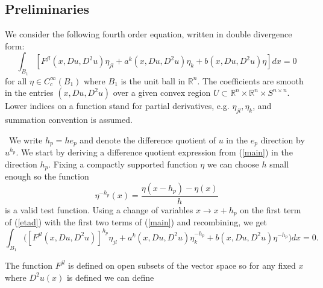 \documentclass[12pt,leqno]{amsart}%
\theoremstyle{plain}
\numberwithin{equation}{section}
\theoremstyle{definition}
\begin{document}


\label{sec_fourth}


\subsection{Preliminaries}

\label{pre} We consider the following fourth order equation, written in double
divergence form:
\begin{equation}
\int_{B_{1}}\left[  F^{jl}(x,Du,D^{2}u)\eta_{jl}+a^{k}(x,Du,D^{2}u)\eta
_{k}+b(x,Du,D^{2}u)\eta\right]  dx=0 \label{main}%
\end{equation}
for all $\eta\in C_{c}^{\infty}(B_{1})$ where $B_{1}$ is the unit ball in
$\mathbb{R}^{n}$. The coefficients are smooth in the entries $(x,Du,D^{2}u)$
over a given convex region $U\subset\mathbb{R}^{n}\times\mathbb{R}^{n}\times
S^{n\times n}.$ Lower indices on a function stand for partial derivatives,
e.g. $\eta_{jl},\eta_{k}$, and summation convention is assumed. \newline

\ We write $h_{p}=he_{p}$ and denote the difference quotient of $u$ in the
$e_{p}$ direction by $u^{h_{p}}$. We start by deriving a difference quotient
expression from (\ref{main}) in the direction $h_{p}$. Fixing a compactly
supported function $\eta$ we can choose $h$ small enough so the function
\begin{equation}
\eta^{-h_{p}}(x)=\frac{\eta(x-h_{p})-\eta(x)}{h} \label{etad}%
\end{equation}
is a valid test function. Using a change of variables $x\rightarrow x+h_{p}$
on the first term of (\ref{etad}) with the first two terms of (\ref{main}) and
recombining, we get%
\begin{equation}
\int_{B_{1}}\bigg([F^{jl}(x,Du,D^{2}u)]^{h_{p}}\eta_{jl}+a^{k}(x,Du,D^{2}%
u)\eta_{k}^{-h_{p}}+b(x,Du,D^{2}u)\eta^{-h_{p}}\bigg)dx=0. \label{diff1}%
\end{equation}


The function $F^{jl}$ is defined on open subsets of the vector space so for
any fixed $x$ where $D^2u(x)$ is defined we can define%
\end{document}
